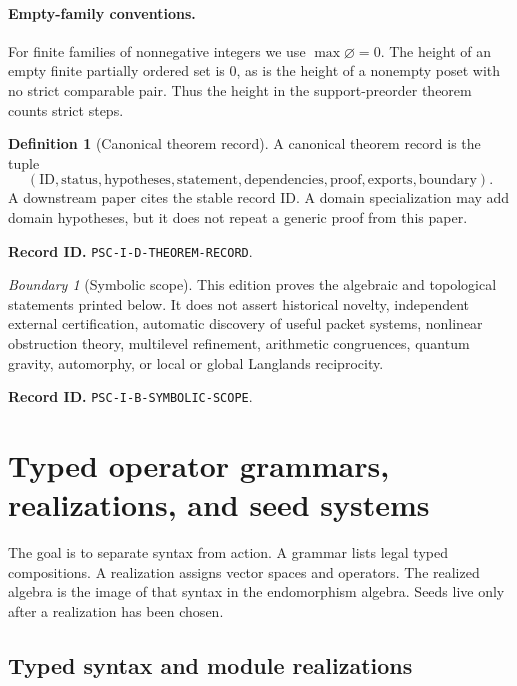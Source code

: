 \documentclass[11pt]{article}
\theoremstyle{definition}
\newtheorem{definition}[definition]{Definition}
\theoremstyle{remark}
\newtheorem{boundary}[boundary]{Boundary}
\newcommand{\RecordID}[1]{\par\smallskip\noindent\begingroup\footnotesize\color{PSCGray}\raggedright\textbf{Record ID.} \nolinkurl{#1}.\par\endgroup}
\begin{document}
\paragraph{Empty-family conventions.} For finite families of nonnegative integers we use $\max\varnothing=0$. The height of an empty finite partially ordered set is $0$, as is the height of a nonempty poset with no strict comparable pair. Thus the height in the support-preorder theorem counts strict steps.

\begin{definition}[Canonical theorem record]
\label{def:theorem-record}
A canonical theorem record is the tuple
\[
(\mathrm{ID},\mathrm{status},\mathrm{hypotheses},\mathrm{statement},
\mathrm{dependencies},\mathrm{proof},\mathrm{exports},\mathrm{boundary}).
\]
A downstream paper cites the stable record ID.  A domain specialization may add domain hypotheses, but it does not repeat a generic proof from this paper.
\end{definition}
\RecordID{PSC-I-D-THEOREM-RECORD}

\begin{boundary}[Symbolic scope]
\label{bnd:symbolic-scope}
This edition proves the algebraic and topological statements printed below.  It does not assert historical novelty, independent external certification, automatic discovery of useful packet systems, nonlinear obstruction theory, multilevel refinement, arithmetic congruences, quantum gravity, automorphy, or local or global Langlands reciprocity.
\end{boundary}
\RecordID{PSC-I-B-SYMBOLIC-SCOPE}

\section{Typed operator grammars, realizations, and seed systems}
\begin{readerroadmap}
The goal is to separate syntax from action.  A grammar lists legal typed compositions.  A realization assigns vector spaces and operators.  The realized algebra is the image of that syntax in the endomorphism algebra.  Seeds live only after a realization has been chosen.
\end{readerroadmap}
\subsection{Typed syntax and module realizations}
\end{document}
